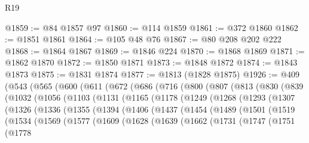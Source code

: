 \begin{lexlean}{R19}
\begin{coremodule}
{{{{{{{{{{{{{{{{{{{{{{{{{{{{{{{{{{{{{{{{{{{{{{{{{{{{{{{{{{{{{{{{{{{{{{{{{{{{{{{{{{{{{{{@1859 := @84 @1857 @97
@1860 := @114 @1859
@1861 := @372 @1860
@1862 := @1851 @1861
@1864 := @105 @48 @76
@1867 := @80 @208 @202 @222
@1868 := @1864 @1867
@1869 := @1846 @224
@1870 := @1868 @1869
@1871 := @1862 @1870
@1872 := @1850 @1871
@1873 := @1848 @1872
@1874 := @1843 @1873
@1875 := @1831 @1874
@1877 := @1813 (@1828 @1875)
@1926 := @409
    (@543
      (@565
        (@600
          (@611
            (@672
              (@686
                (@716
                  (@800
                    (@807
                      (@813
                        (@830
                          (@839
                            (@1032
                              (@1056
                                (@1103
                                  (@1131
                                    (@1165
                                      (@1178
                                        (@1249
                                          (@1268
                                            (@1293
                                              (@1307
                                                (@1326
                                                  (@1336
                                                    (@1355
                                                      (@1394
                                                        (@1406
                                                          (@1437
                                                            (@1454
                                                              (@1489
                                                                (@1501
                                                                  (@1519
                                                                    (@1534
                                                                      (@1569
                                                                        (@1577
                                                                          (@1609
                                                                            (@1628
                                                                              (@1639
                                                                                (@1662
                                                                                  (@1731
                                                                                    (@1747
                                                                                      (@1751
                                                                                        (@1778
}}}}}}}}}}}}}}}}}}}}}}}}}}}}}}}}}}}}}}}}}}}}}}}}}}}}}}}}}}}}}}}}}}}}}}}}}}}}}}}}}}}}}}}
\end{coremodule}
\end{lexlean}
